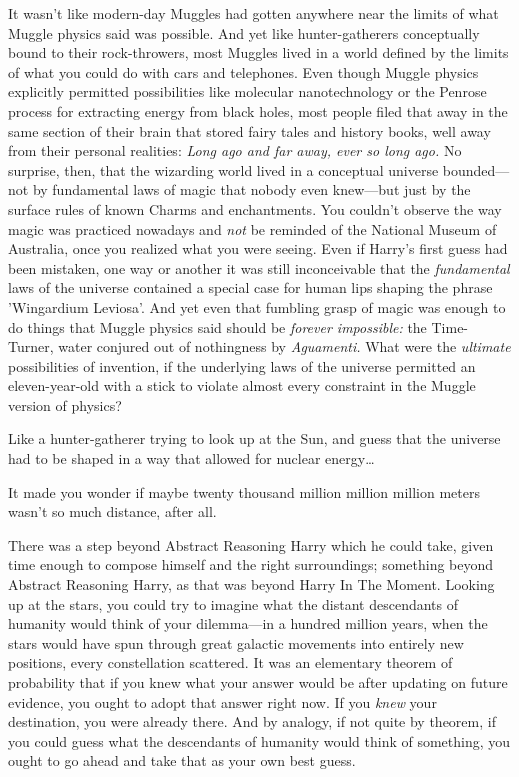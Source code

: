 It wasn't like modern-day Muggles had gotten anywhere near the limits of what 
Muggle physics said was possible. And yet like hunter-gatherers conceptually 
bound to their rock-throwers, most Muggles lived in a world defined by the 
limits of what you could do with cars and telephones. Even though Muggle 
physics explicitly permitted possibilities like molecular nanotechnology or the 
Penrose process for extracting energy from black holes, most people filed that 
away in the same section of their brain that stored fairy tales and history 
books, well away from their personal realities: \emph{Long ago and far away, 
ever so long ago.} No surprise, then, that the wizarding world lived in a 
conceptual universe bounded---not by fundamental laws of magic that nobody even 
knew---but just by the surface rules of known Charms and enchantments. You 
couldn't observe the way magic was practiced nowadays and \emph{not} be 
reminded of the National Museum of Australia, once you realized what you were 
seeing. Even if Harry's first guess had been mistaken, one way or another it 
was still inconceivable that the \emph{fundamental} laws of the universe 
contained a special case for human lips shaping the phrase 'Wingardium 
Leviosa'. And yet even that fumbling grasp of magic was enough to do things 
that Muggle physics said should be \emph{forever impossible:} the Time-Turner, 
water conjured out of nothingness by \emph{Aguamenti.} What were the 
\emph{ultimate} possibilities of invention, if the underlying laws of the 
universe permitted an eleven-year-old with a stick to violate almost every 
constraint in the Muggle version of physics?

Like a hunter-gatherer trying to look up at the Sun, and guess that the 
universe had to be shaped in a way that allowed for nuclear energy{\ldots}

It made you wonder if maybe twenty thousand million million million meters 
wasn't so much distance, after all.

There was a step beyond Abstract Reasoning Harry which he could take, given 
time enough to compose himself and the right surroundings; something beyond 
Abstract Reasoning Harry, as that was beyond Harry In The Moment. Looking up at 
the stars, you could try to imagine what the distant descendants of humanity 
would think of your dilemma---in a hundred million years, when the stars would 
have spun through great galactic movements into entirely new positions, every 
constellation scattered. It was an elementary theorem of probability that if 
you knew what your answer would be after updating on future evidence, you ought 
to adopt that answer right now. If you \emph{knew} your destination, you were 
already there. And by analogy, if not quite by theorem, if you could guess what 
the descendants of humanity would think of something, you ought to go ahead and 
take that as your own best guess.

